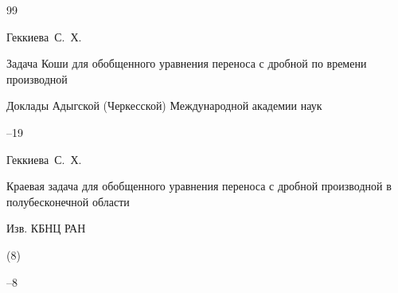 \begin{thebibliography}{99}









\by Геккиева~С.~Х.

\paper Задача Коши для обобщенного уравнения переноса с дробной по времени производной

\jour Доклады Адыгской (Черкесской) Международной академии наук




--19















\by Геккиева~С.~Х.

\paper Краевая задача для обобщенного уравнения переноса с дробной производной в полубесконечной области

\jour Изв. КБНЦ РАН


(8)

--8





\end{thebibliography}
